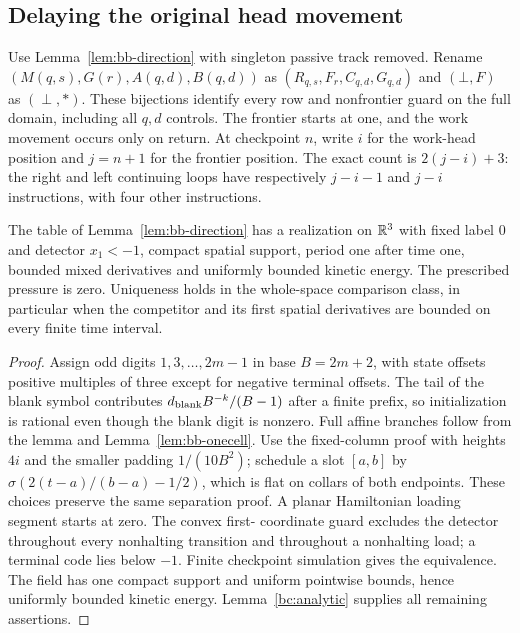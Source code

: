 \subsection{Delaying the original head movement}\label{bc:delayed-column-section}
Use Lemma~\ref{lem:bb-direction} with singleton passive track removed.
Rename $(M(q,s),G(r),A(q,d),B(q,d))$ as
$(R_{q,s},F_r,C_{q,d},G_{q,d})$ and $(\bot,F)$ as $(\perp,*)$.
These bijections identify every row and nonfrontier guard on the full
domain, including all $q,d$ controls. The frontier starts at one, and the
work movement occurs only on return. At checkpoint $n$, write $i$ for
the work-head position and $j=n+1$ for the frontier position. The exact count is
$2(j-i)+3$: the right and left continuing loops have respectively
$j-i-1$ and $j-i$ instructions, with four other instructions.

\begin{theorem}\label{bc:delayed-column-event}
The table of Lemma~\ref{lem:bb-direction} has a realization on $\mathbb R^3$
with fixed label $0$ and detector $x_1<-1$, compact spatial support,
period one after time one, bounded mixed derivatives and uniformly bounded
kinetic energy. The prescribed pressure is zero. Uniqueness holds in the
whole-space comparison class, in particular when the competitor and its
first spatial derivatives are bounded on every finite time interval.
\end{theorem}
\begin{proof}\label{bc:delayed-column-event-proof}
Assign odd digits $1,3,\ldots,2m-1$ in base $B=2m+2$, with state
offsets positive multiples of three except for negative terminal offsets.
The tail of the blank symbol contributes
$d_{\rm blank}B^{-k}/(B-1)$ after a finite prefix, so initialization is
rational even though the blank digit is nonzero. Full affine branches
follow from the lemma and Lemma~\ref{lem:bb-onecell}. Use the fixed-column
proof with heights $4i$ and the smaller padding $1/(10B^2)$; schedule a
slot $[a,b]$ by $\sigma(2(t-a)/(b-a)-1/2)$, which is flat on collars
of both endpoints. These choices preserve the same separation proof.
A planar Hamiltonian loading segment starts at zero. The convex first-
coordinate guard excludes the detector throughout every nonhalting
transition and throughout a nonhalting load; a terminal code lies below
$-1$. Finite checkpoint simulation gives the equivalence. The field has
one compact support and uniform pointwise bounds, hence uniformly bounded
kinetic energy. Lemma~\ref{bc:analytic} supplies all remaining assertions.
\end{proof}

